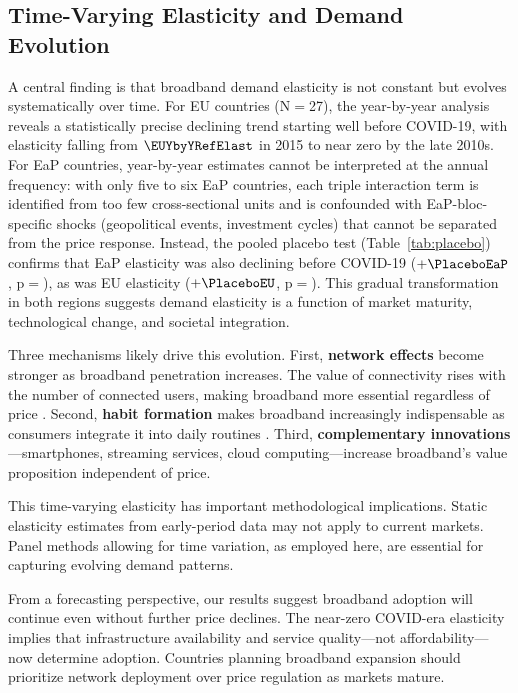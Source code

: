 \subsection{Time-Varying Elasticity and Demand Evolution}

A central finding is that broadband demand elasticity is not constant but evolves systematically over time. For EU countries (N$=$27), the year-by-year analysis reveals a statistically precise declining trend starting well before COVID-19, with elasticity falling from $\EUYbyYRefElast$ in 2015 to near zero by the late 2010s. For EaP countries, year-by-year estimates cannot be interpreted at the annual frequency: with only five to six EaP countries, each triple interaction term is identified from too few cross-sectional units and is confounded with EaP-bloc-specific shocks (geopolitical events, investment cycles) that cannot be separated from the price response. Instead, the pooled placebo test (Table~\ref{tab:placebo}) confirms that EaP elasticity was also declining before COVID-19 ($+\PlaceboEaP$, p$=$\PlaceboEaPPval), as was EU elasticity ($+\PlaceboEU$, p$=$\PlaceboEUPval). This gradual transformation in both regions suggests demand elasticity is a function of market maturity, technological change, and societal integration.

Three mechanisms likely drive this evolution. First, \textbf{network effects} become stronger as broadband penetration increases. The value of connectivity rises with the number of connected users, making broadband more essential regardless of price \citep{katz1985network}. Second, \textbf{habit formation} makes broadband increasingly indispensable as consumers integrate it into daily routines \citep{becker1988theory}. Third, \textbf{complementary innovations}---smartphones, streaming services, cloud computing---increase broadband's value proposition independent of price.

This time-varying elasticity has important methodological implications. Static elasticity estimates from early-period data may not apply to current markets. Panel methods allowing for time variation, as employed here, are essential for capturing evolving demand patterns.

From a forecasting perspective, our results suggest broadband adoption will continue even without further price declines. The near-zero COVID-era elasticity implies that infrastructure availability and service quality---not affordability---now determine adoption. Countries planning broadband expansion should prioritize network deployment over price regulation as markets mature.

